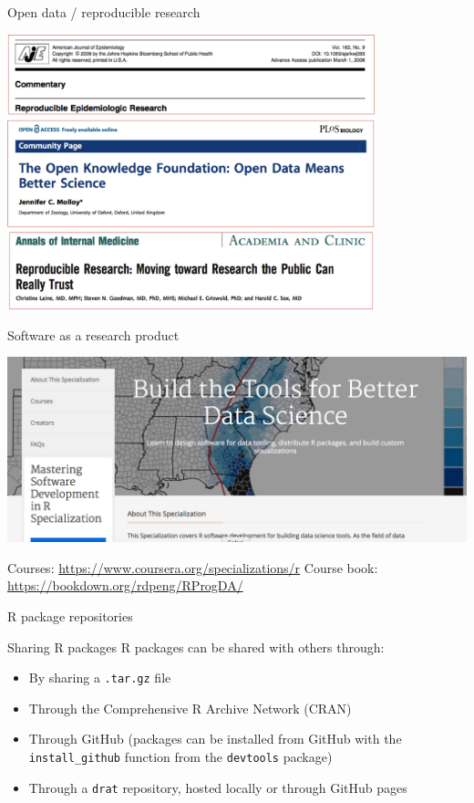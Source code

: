 \documentclass[ignorenonframetext,]{beamer}
\begin{document}
\begin{frame}{Open data / reproducible research}

\begin{center}\includegraphics[width=0.8\textwidth]{open_data_headlines} \end{center}

\end{frame}

\begin{frame}{Software as a research product}

\includegraphics[width=\textwidth]{coursera_screenshot}

Courses: \url{https://www.coursera.org/specializations/r} Course book:
\url{https://bookdown.org/rdpeng/RProgDA/}

\end{frame}

\begin{frame}{R package repositories}

\begin{block}{Sharing R packages}
R packages can be shared with others through: 
\begin{itemize}
  \item By sharing a \texttt{.tar.gz} file
  \item Through the Comprehensive R Archive Network (CRAN)
  \item Through GitHub (packages can be installed from GitHub with the \texttt{install\_github} function from the \texttt{devtools} package)
  \item Through a \texttt{drat} repository, hosted locally or through GitHub pages
\end{itemize}
\end{block}

\end{frame}
\end{document}
